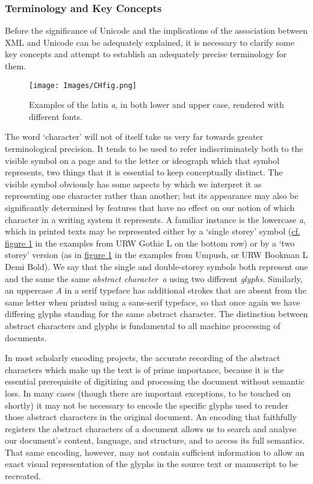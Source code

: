 \subsubsection[{Terminology and Key Concepts}]{Terminology and Key Concepts}\label{D4-42}\par
Before the significance of Unicode and the implications of the association between XML and Unicode can be adequately explained, it is necessary to clarify some key concepts and attempt to establish an adequately precise terminology for them.\par
\begin{figure}[htbp]
\noindent\noindent\texttt{[image: Images/CHfig.png]}
\caption{\label{fig1}Examples of the latin \textit{a}, in both lower and upper case, rendered with different fonts.}\end{figure}
\par
The word ‘character’ will not of itself take us very far towards greater terminological precision. It tends to be used to refer indiscriminately both to the visible symbol on a page and to the letter or ideograph which that symbol represents, two things that it is essential to keep conceptually distinct. The visible symbol obviously has some aspects by which we interpret it as representing one character rather than another; but its appearance may also be significantly determined by features that have no effect on our notion of which character in a writing system it represents. A familiar instance is the lowercase \textit{a}, which in printed texts may be represented either by a ‘single storey’ symbol (\hyperref[fig1]{cf. figure 1} in the examples from URW Gothic L on the bottom row) or by a ‘two storey’ version (as in \hyperref[fig1]{figure 1} in the examples from Umpush, or URW Bookman L Demi Bold). We say that the single and double-storey symbols both represent one and the same the same \textit{abstract character} \textit{a} using two different \textit{glyphs}. Similarly, an uppercase \textit{A} in a serif typeface has additional strokes that are absent from the same letter when printed using a sans-serif typeface, so that once again we have differing glyphs standing for the same abstract character. The distinction between abstract characters and glyphs is fundamental to all machine processing of documents.\par
In most scholarly encoding projects, the accurate recording of the abstract characters which make up the text is of prime importance, because it is the essential prerequisite of digitizing and processing the document without semantic loss. In many cases (though there are important exceptions, to be touched on shortly) it may not be necessary to encode the specific glyphs used to render those abstract characters in the original document. An encoding that faithfully registers the abstract characters of a document allows us to search and analyse our document's content, language, and structure, and to access its full semantics. That same encoding, however, may not contain sufficient information to allow an exact visual representation of the glyphs in the source text or manuscript to be recreated. \par
